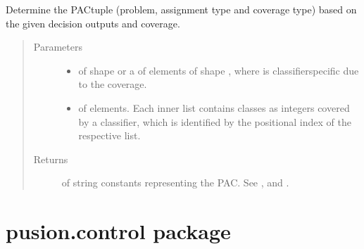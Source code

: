 \documentclass[letterpaper,10pt,english]{sphinxmanual}
\begin{document}

\begin{fulllineitems}
\label{\detokenize{pusion.auto.detector:pusion.auto.detector.determine_pac}}
\sphinxAtStartPar
Determine the PAC\sphinxhyphen{}tuple (problem, assignment type and coverage type) based on the given decision outputs and
coverage.
\begin{quote}\begin{description}
\item[{Parameters}] \leavevmode\begin{itemize}
\item {} 
\sphinxAtStartPar
{} \textendash{}  of shape  or a  of
 elements of shape , where  is classifier\sphinxhyphen{}specific
due to the coverage.

\item {} 
\sphinxAtStartPar
{} \textendash{}  of  elements. Each inner list contains classes as integers covered by a classifier,
which is identified by the positional index of the respective list.

\end{itemize}

\item[{Returns}] \leavevmode
\sphinxAtStartPar
{} of string constants representing the PAC. See ,
 and .

\end{description}\end{quote}

\end{fulllineitems}



\section{pusion.control package}
\label{\detokenize{pusion.control:pusion-control-package}}\label{\detokenize{pusion.control::doc}}
\end{document}
